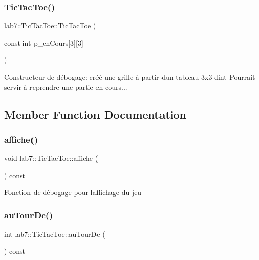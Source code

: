 \subsubsection{\texorpdfstring{Tic\+Tac\+Toe()}{TicTacToe()}\hspace{0.1cm}{\footnotesize\ttfamily [2/2]}}
{\footnotesize\ttfamily lab7\+::\+Tic\+Tac\+Toe\+::\+Tic\+Tac\+Toe (\begin{DoxyParamCaption}\item[{const int}]{p\+\_\+en\+Cours\mbox{[}3\mbox{]}\mbox{[}3\mbox{]} }\end{DoxyParamCaption})}

Constructeur de débogage\+: créé une grille à partir d\textquotesingle{}un tableau 3x3 d\textquotesingle{}int Pourrait servir à reprendre une partie en cours... 

\subsection{Member Function Documentation}
\mbox{\label{classlab7_1_1TicTacToe_a09cc7980d7f465b21880971e5bccf178}} 
\subsubsection{\texorpdfstring{affiche()}{affiche()}}
{\footnotesize\ttfamily void lab7\+::\+Tic\+Tac\+Toe\+::affiche (\begin{DoxyParamCaption}{ }\end{DoxyParamCaption}) const}

Fonction de débogage pour l\textquotesingle{}affichage du jeu \mbox{\label{classlab7_1_1TicTacToe_afb556c0c233a8eb48a67cda693ca8caf}} 
\subsubsection{\texorpdfstring{au\+Tour\+De()}{auTourDe()}}
{\footnotesize\ttfamily int lab7\+::\+Tic\+Tac\+Toe\+::au\+Tour\+De (\begin{DoxyParamCaption}{ }\end{DoxyParamCaption}) const}

